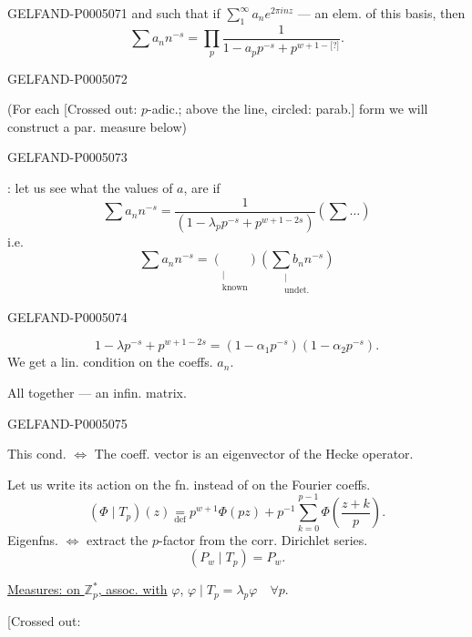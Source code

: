 \begin{GelfandAdjacentEvidence}{GELFAND-P000507}{1}
and such that if $\displaystyle\sum_1^\infty a_ne^{2\pi inz}$ — an elem. of this basis, then
\[
\sum a_nn^{-s}=\prod_p\frac{1}{1-a_pp^{-s}+p^{w+1-\text{[?]}}}.
\]
\end{GelfandAdjacentEvidence}
\begin{GelfandAdjacentEvidence}{GELFAND-P000507}{2}


(For each [Crossed out: $p$-adic.; above the line, circled: parab.]
form we will construct a par. measure below)
\end{GelfandAdjacentEvidence}
\begin{GelfandAdjacentEvidence}{GELFAND-P000507}{3}


: let us see what the values of $a$, are if
\[
\sum a_nn^{-s}=
\frac{1}{\left(1-\lambda_pp^{-s}+p^{w+1-2s}\right)}
\left(\sum\ldots\right)
\]
i.e.
\[
\sum a_nn^{-s}=
\underset{\substack{\vert\\\text{known}}}{\left(\qquad\right)}
\underset{\substack{\vert\\\text{undet.}}}
  {\left(\sum b_nn^{-s}\right)}
\]
\end{GelfandAdjacentEvidence}
\begin{GelfandAdjacentEvidence}{GELFAND-P000507}{4}

\[
1-\lambda p^{-s}+p^{w+1-2s}=(1-\alpha_1p^{-s})(1-\alpha_2p^{-s}).
\]
We get a lin. condition on the coeffs. $a_n$.

All together — an infin. matrix.
\end{GelfandAdjacentEvidence}
\begin{GelfandAdjacentEvidence}{GELFAND-P000507}{5}


This cond. $\Longleftrightarrow$ The coeff. vector is an eigenvector of the Hecke operator.

Let us write its action on the fn. instead of on the Fourier coeffs.
\[
(\Phi\mid T_p)(z)\underset{\mathrm{def}}{=}
p^{w+1}\Phi(pz)+p^{-1}\sum_{k=0}^{p-1}\Phi\left(\frac{z+k}{p}\right).
\]
Eigenfns. $\Longleftrightarrow$ extract the $p$-factor from the corr. Dirichlet series.
\[
(P_w\mid T_p)=P_w.
\]

\uline{Measures: on \mbox{$\mathbb Z_p^*$}, assoc. with}
$\varphi$, $\varphi\mid T_p=\lambda_p\varphi\quad\forall p$.

[Crossed out: 
\end{GelfandAdjacentEvidence}
